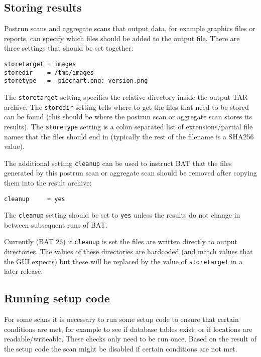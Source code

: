 \documentclass[10pt,a4paper]{article}
\begin{document}
\subsection{Storing results}

Postrun scans and aggregate scans that output data, for example graphics files
or reports, can specify which files should be added to the output file. There
are three settings that should be set together:

\begin{verbatim}
storetarget = images
storedir    = /tmp/images
storetype   = -piechart.png:-version.png
\end{verbatim}

The \texttt{storetarget} setting specifies the relative directory inside the
output TAR archive. The \texttt{storedir} setting tells where to get the files
that need to be stored can be found (this should be where the postrun scan
or aggregate scan stores its results). The \texttt{storetype} setting is a colon
separated list of extensions/partial file names that the files should end in
(typically the rest of the filename is a SHA256 value).

The additional setting \texttt{cleanup} can be used to instruct BAT that the
files generated by this postrun scan or aggregate scan should be removed after
copying them into the result archive:

\begin{verbatim}
cleanup     = yes
\end{verbatim}

The \texttt{cleanup} setting should be set to \texttt{yes} unless the results
do not change in between subsequent runs of BAT.

Currently (BAT 26) if \texttt{cleanup} is set the files are written directly to
output directories. The values of these directories are hardcoded (and match
values that the GUI expects) but these will be replaced by the value of
\texttt{storetarget} in a later release.

\subsection{Running setup code}

For some scans it is necessary to run some setup code to ensure that certain
conditions are met, for example to see if database tables exist, or if locations
are readable/writeable. These checks only need to be run once. Based on the
result of the setup code the scan might be disabled if certain conditions are
not met.
\end{document}
